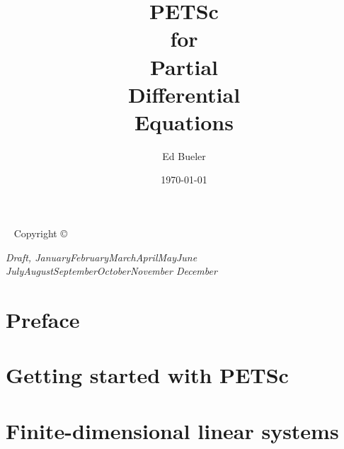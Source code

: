 \documentclass{tufte-book}
\title[PETSc for PDEs]{PETSc \\ for \\ Partial \\ Differential \\ Equations}
\author{Ed Bueler}
\date{\today}
\newcommand{\CODELOC}{}  %
\theoremstyle{definition}
\newcommand{\openepigraph}[2]{%
  \begin{fullwidth}
  \sffamily\large
  \begin{doublespace}
  \noindent\allcaps{#1}\\%
  \noindent \Large \allcaps{#2}%
  \end{doublespace}
  \end{fullwidth}
}
\newcommand{\monthyear}{%
  \ifcase\month\or January\or February\or March\or April\or May\or June\or
  July\or August\or September\or October\or November\or
  December\fi\space\number\year
}
\begin{document}
\begin{comment}
\newpage\thispagestyle{empty}
\openepigraph{%
\dots when there are disputes among persons, we can simply say: Let us calculate, without further ado, to see who is right.
}{Gottfried Wilhelm Leibniz}
\vfill
\openepigraph{%
Developing parallel, nontrivial PDE solvers that deliver high performance is still difficult and requires months (or even years) of concentrated effort.  PETSc is a toolkit that can ease these difficulties and reduce the development time, but it is not a black-box PDE solver, nor a silver bullet
}{Barry Smith}
\vfill
\openepigraph{%
Tufte's style is known for its extensive use of sidenotes, tight integration of graphics with text, and well-set typography.
}{The Tufte-LaTeX\ Developers}
\vfill

\frontmatter
\end{comment}

\maketitle


\newpage
\begin{fullwidth}
~\vfill
\thispagestyle{empty}
\setlength{\parindent}{0pt}
\setlength{\parskip}{\baselineskip}
Copyright \copyright\ \the\year\ \thanklessauthor

\par{}

\par\textit{Draft, \monthyear}
\end{fullwidth}

\tableofcontents




\chapter*{Preface}


\mainmatter


\chapter{Getting started with PETSc}
\label{chap:gs}
\renewcommand{\CODELOC}{ch1/}


\chapter{Finite-dimensional linear systems}
\label{chap:ls}
\renewcommand{\CODELOC}{ch2/}

\end{document}
